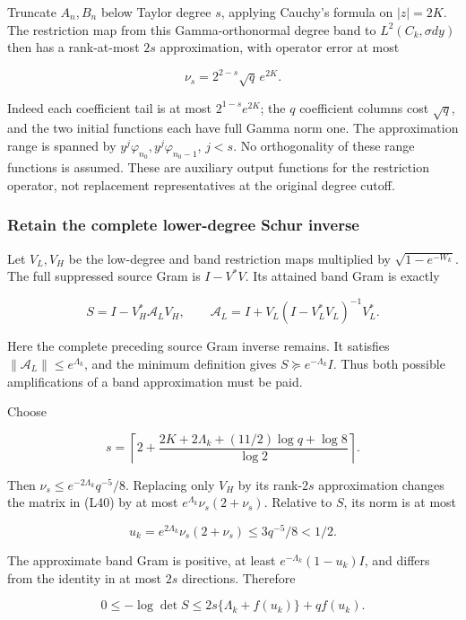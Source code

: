 \documentclass[11pt,a4paper]{article}
\begin{document}
Truncate \(A_n,B_n\) below Taylor degree \(s\), applying Cauchy's formula on \(|z|=2K\). The restriction map from this Gamma-orthonormal degree band to \(L^2(C_k,\sigma dy)\) then has a rank-at-most \(2s\) approximation, with operator error at most

\[
\nu_s=2^{2-s}\sqrt q\,e^{2K}.
\tag{L39}
\]

Indeed each coefficient tail is at most \(2^{1-s}e^{2K}\); the \(q\) coefficient columns cost \(\sqrt q\), and the two initial functions each have full Gamma norm one. The approximation range is spanned by
\(y^j\varphi_{n_0},y^j\varphi_{n_0-1}\), \(j<s\). No orthogonality of these range functions is assumed. These are auxiliary output functions for the restriction operator, not replacement representatives at the original degree cutoff.

\subsubsection{Retain the complete lower-degree Schur inverse}\label{loc:retain-the-complete-lower-degree-schur-inverse}

Let \(V_L,V_H\) be the low-degree and band restriction maps multiplied by \(\sqrt{1-e^{-W_k}}\). The full suppressed source Gram is \(I-V^*V\). Its attained band Gram is exactly

\[
\boxed{S=I-V_H^*\mathcal A_LV_H,\qquad
\mathcal A_L=I+V_L(I-V_L^*V_L)^{-1}V_L^*.}
\tag{L40}
\]

Here the complete preceding source Gram inverse remains. It satisfies
\(\|\mathcal A_L\|\le e^{\Lambda_k}\), and the minimum definition gives
\(S\succeq e^{-\Lambda_k}I\). Thus both possible amplifications of a band approximation must be paid.

Choose

\[
\boxed{s=\left\lceil 2+
\frac{2K+2\Lambda_k+(11/2)\log q+\log8}{\log2}\right\rceil.}
\tag{L41}
\]

Then \(\nu_s\le e^{-2\Lambda_k}q^{-5}/8\). Replacing only \(V_H\) by its rank-\(2s\) approximation changes the matrix in (L40) by at most
\(e^{\Lambda_k}\nu_s(2+\nu_s)\). Relative to \(S\), its norm is at most

\[
u_k=e^{2\Lambda_k}\nu_s(2+\nu_s)\le3q^{-5}/8<1/2.
\]

The approximate band Gram is positive, at least
\(e^{-\Lambda_k}(1-u_k)I\), and differs from the identity in at most \(2s\) directions. Therefore

\[
0\le-\log\det S\le2s\{\Lambda_k+f(u_k)\}+qf(u_k).
\tag{L42}
\]
\end{document}
